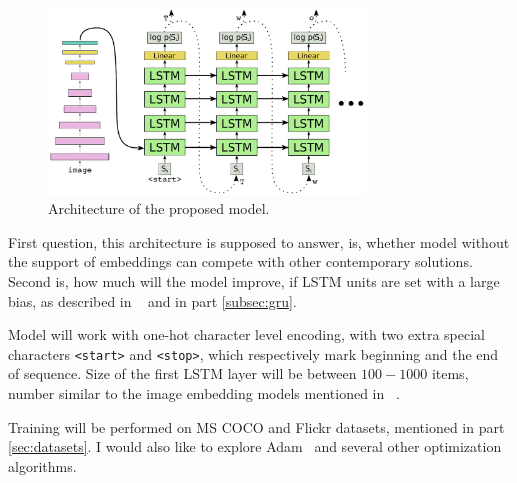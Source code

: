 \begin{figure}[!t]
	\centering
	\includegraphics[width=0.75\textwidth]{./fig/proposed-model.pdf}
	\caption{Architecture of the proposed model.
		\label{fig:proposedModel}}
\end{figure}

First question, this architecture is supposed to answer, is, whether model without the support of embeddings can compete with other contemporary solutions. Second is, how much will the model improve, if LSTM units are set with a large bias, as described in ~\cite{DBLP:conf/icml/JozefowiczZS15} and in part \ref{subsec:gru}.

Model will work with one-hot character level encoding, with two extra special characters \texttt{<start>} and \texttt{<stop>}, which respectively mark beginning and the end of sequence. Size of the first LSTM layer will be between $ 100-1000 $ items, number similar to the image embedding models mentioned in ~\cite{DBLP:journals/corr/VinyalsTBE14, DBLP:journals/corr/FangGISDDGHMPZZ14}.

Training will be performed on MS COCO and Flickr datasets, mentioned in part \ref{sec:datasets}. I would also like to explore Adam~\cite{DBLP:journals/corr/KingmaB14} and several other optimization algorithms.

